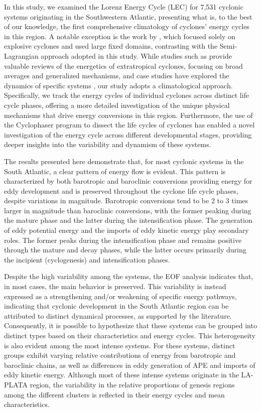 \documentclass[pdflatex,sn-chicago]{sn-jnl}%
\theoremstyle{plain}
\theoremstyle{definition}
\theoremstyle{remark}
\theoremstyle{definition}
\begin{document}
In this study, we examined the Lorenz Energy Cycle (LEC) for 7,531 cyclonic systems originating in the Southwestern Atlantic, presenting what is, to the best of our knowledge, the first comprehensive climatology of cyclones' energy cycles in this region. A notable exception is the work by \citet{black2013universal}, which focused solely on explosive cyclones and used large fixed domains, contrasting with the Semi-Lagrangian approach adopted in this study. While studies such as \citet{smith1980energetics} provide valuable reviews of the energetics of extratropical cyclones, focusing on broad averages and generalized mechanisms, and case studies have explored the dynamics of specific systems \citep[e.g.]{pezza2014large,dias2011energy,cavicchia2018energetics}, our study adopts a climatological approach. Specifically, we track the energy cycles of individual cyclones across distinct life cycle phases, offering a more detailed investigation of the unique physical mechanisms that drive energy conversions in this region. Furthermore, the use of the Cyclophaser program to dissect the life cycles of cyclones has enabled a novel investigation of the energy cycle across different developmental stages, providing deeper insights into the variability and dynamism of these systems.

The results presented here demonstrate that, for most cyclonic systems in the South Atlantic, a clear pattern of energy flow is evident. This pattern is characterized by both barotropic and baroclinic conversions providing energy for eddy development and is preserved throughout the cyclone life cycle phases, despite variations in magnitude. Barotropic conversions tend to be 2 to 3 times larger in magnitude than baroclinic conversions, with the former peaking during the mature phase and the latter during the intensification phase. The generation of eddy potential energy and the imports of eddy kinetic energy play secondary roles. The former peaks during the intensification phase and remains positive through the mature and decay phases, while the latter occurs primarily during the incipient (cyclogenesis) and intensification phases.

Despite the high variability among the systems, the EOF analysis indicates that, in most cases, the main behavior is preserved. This variability is instead expressed as a strengthening and/or weakening of specific energy pathways, indicating that cyclonic development in the South Atlantic region can be attributed to distinct dynamical processes, as supported by the literature. Consequently, it is possible to hypothesize that these systems can be grouped into distinct types based on their characteristics and energy cycles. This heterogeneity is also evident among the most intense systems. For these systems, distinct groups exhibit varying relative contributions of energy from barotropic and baroclinic chains, as well as differences in eddy generation of APE and imports of eddy kinetic energy. Although most of these intense systems originate in the LA-PLATA region, the variability in the relative proportions of genesis regions among the different clusters is reflected in their energy cycles and mean characteristics.
\end{document}
